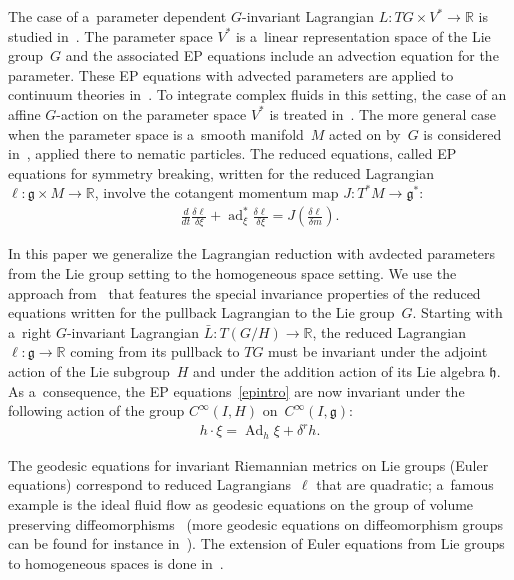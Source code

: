 \documentclass[pdftex]{sigma}
\numberwithin{equation}{section}
\begin{document}
The case of a~parameter dependent $G$-invariant Lagrangian $L:TG\times V^*\to\mathbb R$ is studied in~\cite{CHMR}.
The parameter space $V^*$ is a~linear representation space of the Lie group~$G$ and the associated EP equations include
an advection equation for the parameter.
These EP equations with advected parameters are applied to continuum theories in~\cite{HMR}.
To integrate complex f\/luids in this setting, the case of an af\/f\/ine $G$-action on the parameter space $V^*$ is treated
in~\cite{GBR}.
The more general case when the parameter space is a~smooth manifold~$M$ acted on by~$G$ is considered in~\cite{GBT},
applied there to nematic particles.
The reduced equations, called EP equations for symmetry breaking, written for the reduced Lagrangian $\ell:\mathfrak
g\times M\to\mathbb R$, involve the cotangent momentum map $J:T^*M\to\mathfrak g^*$:
\begin{gather*}
\frac{d}{dt}\frac{\delta\ell}{\delta\xi}+\operatorname{ad}^*_\xi\frac{\delta
\ell}{\delta\xi}=J\left(\frac{\delta\ell}{\delta m}\right).
\end{gather*}

In this paper we generalize the Lagrangian reduction with avdected parameters from the Lie group setting to the
homogeneous space setting.
We use the approach from~\cite{TV} that features the special invariance properties of the reduced equations written for
the pullback Lagrangian to the Lie group~$G$.
Starting with a~right $G$-invariant Lagrangian $\bar L:T(G/H)\to\mathbb R$, the reduced Lagrangian $\ell:\mathfrak
g\to\mathbb R$ coming from its pullback to $TG$ must be invariant under the adjoint action of the Lie subgroup~$H$ and
under the addition action of its Lie algebra $\mathfrak h$.
As a~consequence, the EP equations~\eqref{epintro} are now invariant under the following action of the group
$C^{\infty}(I,H)$ on~$C^{\infty}(I,\mathfrak g)$:
\begin{gather*}
h\cdot \xi=\operatorname{Ad}_h\xi+\delta^rh.
\end{gather*}

The geodesic equations for invariant Riemannian metrics on Lie groups (Euler equations) correspond to reduced
Lagrangians~$\ell$ that are quadratic; a~famous example is the ideal f\/luid f\/low as geodesic equations on the group of
volume preserving dif\/feomorphisms~\cite{Arnold} (more geodesic equations on dif\/feomorphism groups can be found for
instance in~\cite{Vizman}).
The extension of Euler equations from Lie groups to homogeneous spaces is done in~\cite{KM}.
\end{document}
